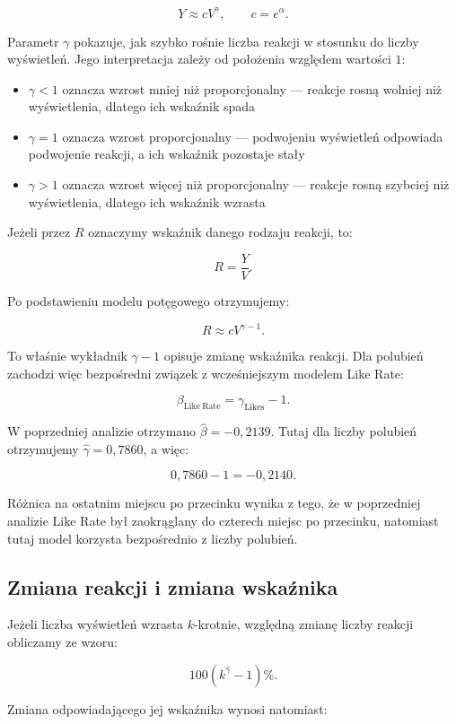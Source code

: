 \documentclass[12pt,a4paper]{article}
\begin{document}
\[
Y\approx cV^{\gamma},
\qquad
c=e^{\alpha}.
\]

Parametr $\gamma$ pokazuje, jak szybko rośnie liczba reakcji w stosunku do liczby wyświetleń. Jego interpretacja zależy od położenia względem wartości $1$:

\begin{itemize}
    \item $\gamma<1$ oznacza wzrost mniej niż proporcjonalny --- reakcje rosną wolniej niż wyświetlenia, dlatego ich wskaźnik spada
    \item $\gamma=1$ oznacza wzrost proporcjonalny --- podwojeniu wyświetleń odpowiada podwojenie reakcji, a ich wskaźnik pozostaje stały
    \item $\gamma>1$ oznacza wzrost więcej niż proporcjonalny --- reakcje rosną szybciej niż wyświetlenia, dlatego ich wskaźnik wzrasta
\end{itemize}

Jeżeli przez $R$ oznaczymy wskaźnik danego rodzaju reakcji, to:

\[
R=\frac{Y}{V}.
\]

Po podstawieniu modelu potęgowego otrzymujemy:

\[
R\approx cV^{\gamma-1}.
\]

To właśnie wykładnik $\gamma-1$ opisuje zmianę wskaźnika reakcji. Dla polubień zachodzi więc bezpośredni związek z wcześniejszym modelem Like Rate:

\[
\beta_{\mathrm{Like\ Rate}}=\gamma_{\mathrm{Likes}}-1.
\]

W poprzedniej analizie otrzymano $\widehat{\beta}=-0{,}2139$. Tutaj dla liczby polubień otrzymujemy $\widehat{\gamma}=0{,}7860$, a więc:

\[
0{,}7860-1=-0{,}2140.
\]

Różnica na ostatnim miejscu po przecinku wynika z tego, że w poprzedniej analizie Like Rate był zaokrąglany do czterech miejsc po przecinku, natomiast tutaj model korzysta bezpośrednio z liczby polubień.

\subsection{Zmiana reakcji i zmiana wskaźnika}

Jeżeli liczba wyświetleń wzrasta $k$-krotnie, względną zmianę liczby reakcji obliczamy ze wzoru:

\[
100\left(k^{\widehat{\gamma}}-1\right)\%.
\]

Zmiana odpowiadającego jej wskaźnika wynosi natomiast:
\end{document}
